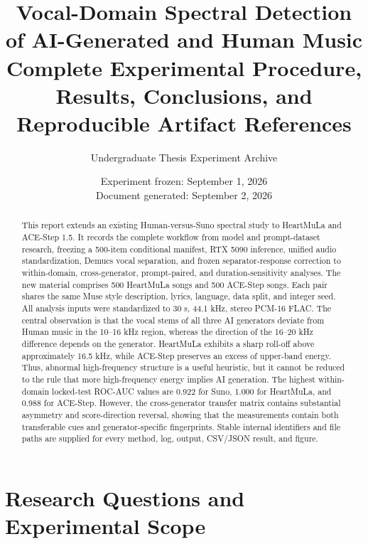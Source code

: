 \documentclass[11pt,a4paper]{article}
\title{Vocal-Domain Spectral Detection of AI-Generated and Human Music\\
\large Complete Experimental Procedure, Results, Conclusions, and Reproducible Artifact References}
\author{Undergraduate Thesis Experiment Archive}
\date{Experiment frozen: September 1, 2026\\Document generated: September 2, 2026}
\begin{document}
\maketitle

\begin{abstract}
This report extends an existing Human-versus-Suno spectral study to HeartMuLa and ACE-Step 1.5. It records the complete workflow from model and prompt-dataset research, freezing a 500-item conditional manifest, RTX 5090 inference, unified audio standardization, Demucs vocal separation, and frozen separator-response correction to within-domain, cross-generator, prompt-paired, and duration-sensitivity analyses. The new material comprises 500 HeartMuLa songs and 500 ACE-Step songs. Each pair shares the same Muse style description, lyrics, language, data split, and integer seed. All analysis inputs were standardized to 30 s, 44.1 kHz, stereo PCM-16 FLAC. The central observation is that the vocal stems of all three AI generators deviate from Human music in the 10--16 kHz region, whereas the direction of the 16--20 kHz difference depends on the generator. HeartMuLa exhibits a sharp roll-off above approximately 16.5 kHz, while ACE-Step preserves an excess of upper-band energy. Thus, abnormal high-frequency structure is a useful heuristic, but it cannot be reduced to the rule that more high-frequency energy implies AI generation. The highest within-domain locked-test ROC-AUC values are 0.922 for Suno, 1.000 for HeartMuLa, and 0.988 for ACE-Step. However, the cross-generator transfer matrix contains substantial asymmetry and score-direction reversal, showing that the measurements contain both transferable cues and generator-specific fingerprints. Stable internal identifiers and file paths are supplied for every method, log, output, CSV/JSON result, and figure.
\end{abstract}

\noindent{}

\tableofcontents
\listoffigures
\listoftables
\clearpage

\section{Research Questions and Experimental Scope}
\label{sec:scope}
\end{document}
